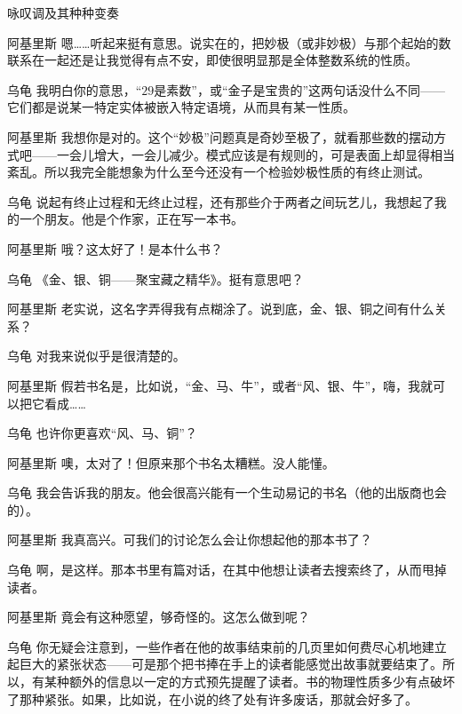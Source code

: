 \begin{dialog}{咏叹调及其种种变奏}
\begin{dialogue}
\item[阿基里斯]嗯……听起来挺有意思。说实在的，把妙极（或非妙极）与那个起始的数联系在一起还是让我觉得有点不安，即使很明显那是全体整数系统的性质。

\item[乌龟]我明白你的意思，“$29$是素数”，或“金子是宝贵的”这两句话没什么不同——它们都是说某一特定实体被嵌入特定语境，从而具有某一性质。

\item[阿基里斯]我想你是对的。这个“妙极”问题真是奇妙至极了，就看那些数的摆动方式吧——一会儿增大，一会儿减少。模式应该是有规则的，可是表面上却显得相当紊乱。所以我完全能想象为什么至今还没有一个检验妙极性质的有终止测试。

\item[乌龟]说起有终止过程和无终止过程，还有那些介于两者之间玩艺儿，我想起了我的一个朋友。他是个作家，正在写一本书。

\item[阿基里斯]哦？这太好了！是本什么书？

\item[乌龟]《金、银、铜——聚宝藏之精华》。挺有意思吧？

\item[阿基里斯]老实说，这名字弄得我有点糊涂了。说到底，金、银、铜之间有什么关系？

\item[乌龟]对我来说似乎是很清楚的。

\item[阿基里斯]假若书名是，比如说，“金、马、牛”，或者“风、银、牛”，嗨，我就可以把它看成……

\item[乌龟]也许你更喜欢“风、马、铜”？

\item[阿基里斯]噢，太对了！但原来那个书名太糟糕。没人能懂。

\item[乌龟]我会告诉我的朋友。他会很高兴能有一个生动易记的书名（他的出版商也会的）。

\item[阿基里斯]我真高兴。可我们的讨论怎么会让你想起他的那本书了？

\item[乌龟]啊，是这样。那本书里有篇对话，在其中他想让读者去搜索终了，从而甩掉读者。

\item[阿基里斯]竟会有这种愿望，够奇怪的。这怎么做到呢？

\item[乌龟]你无疑会注意到，一些作者在他的故事结束前的几页里如何费尽心机地建立起巨大的紧张状态——可是那个把书捧在手上的读者能感觉出故事就要结束了。所以，有某种额外的信息以一定的方式预先提醒了读者。书的物理性质多少有点破坏了那种紧张。如果，比如说，在小说的终了处有许多废话，那就会好多了。


\end{dialogue}
\end{dialog}
